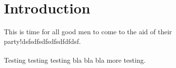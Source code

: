 \section{Introduction}

\paragraph{}
This is time for all good men to come to the aid of their party!dsfsdfsdfsdfsdfdfdsf.

\paragraph{}
Testing testing testing bla bla bla more testing.
